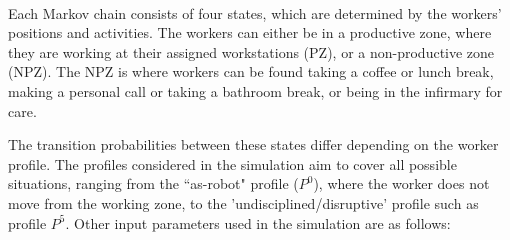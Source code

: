 \documentclass[review,12pt, 3p, times]{elsarticle}
\begin{document}
\begin{table}[htbp]
\begin{tabular}{ccc}
	\end{tabular}\\
	\label{tab:mytable}
\end{table}			
Each Markov chain consists of four states, which are determined by the workers' positions and activities. The workers can either be in a productive zone, where they are working at their assigned workstations (PZ), or a non-productive zone (NPZ). The NPZ is where workers can be found taking a coffee or lunch break, making a personal call or taking a bathroom break, or being in the infirmary for care.
	
The transition probabilities between these states differ depending on the worker profile. The profiles considered in the simulation aim to cover all possible situations, ranging from the “as-robot" profile ($P^0$), where the worker does not move from the working zone, to the 'undisciplined/disruptive' profile such as profile $P^5$. Other input parameters used in the simulation are as follows:
\end{document}
